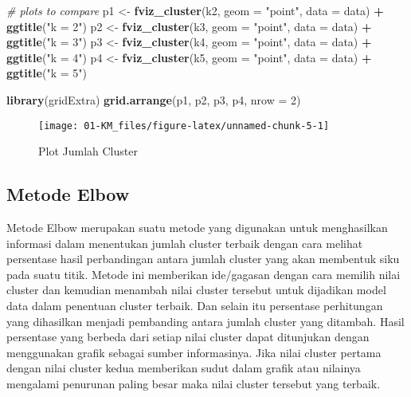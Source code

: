 \documentclass[
]{elegantbook}
\newenvironment{Shaded}{\begin{snugshade}}{\end{snugshade}}
\newcommand{\AttributeTok}[1]{\textcolor[rgb]{0.13,0.29,0.53}{#1}}
\newcommand{\CommentTok}[1]{\textcolor[rgb]{0.56,0.35,0.01}{\textit{#1}}}
\newcommand{\DecValTok}[1]{\textcolor[rgb]{0.00,0.00,0.81}{#1}}
\newcommand{\FunctionTok}[1]{\textcolor[rgb]{0.13,0.29,0.53}{\textbf{#1}}}
\newcommand{\NormalTok}[1]{#1}
\newcommand{\OtherTok}[1]{\textcolor[rgb]{0.56,0.35,0.01}{#1}}
\newcommand{\SpecialCharTok}[1]{\textcolor[rgb]{0.81,0.36,0.00}{\textbf{#1}}}
\newcommand{\StringTok}[1]{\textcolor[rgb]{0.31,0.60,0.02}{#1}}
\begin{document}
\begin{Shaded}
\begin{Highlighting}[]
\CommentTok{\# plots to compare}
\NormalTok{p1 }\OtherTok{\textless{}{-}} \FunctionTok{fviz\_cluster}\NormalTok{(k2, }\AttributeTok{geom =} \StringTok{"point"}\NormalTok{, }\AttributeTok{data =}\NormalTok{ data) }\SpecialCharTok{+} \FunctionTok{ggtitle}\NormalTok{(}\StringTok{"k = 2"}\NormalTok{)}
\NormalTok{p2 }\OtherTok{\textless{}{-}} \FunctionTok{fviz\_cluster}\NormalTok{(k3, }\AttributeTok{geom =} \StringTok{"point"}\NormalTok{,  }\AttributeTok{data =}\NormalTok{ data) }\SpecialCharTok{+} \FunctionTok{ggtitle}\NormalTok{(}\StringTok{"k = 3"}\NormalTok{)}
\NormalTok{p3 }\OtherTok{\textless{}{-}} \FunctionTok{fviz\_cluster}\NormalTok{(k4, }\AttributeTok{geom =} \StringTok{"point"}\NormalTok{,  }\AttributeTok{data =}\NormalTok{ data) }\SpecialCharTok{+} \FunctionTok{ggtitle}\NormalTok{(}\StringTok{"k = 4"}\NormalTok{)}
\NormalTok{p4 }\OtherTok{\textless{}{-}} \FunctionTok{fviz\_cluster}\NormalTok{(k5, }\AttributeTok{geom =} \StringTok{"point"}\NormalTok{,  }\AttributeTok{data =}\NormalTok{ data) }\SpecialCharTok{+} \FunctionTok{ggtitle}\NormalTok{(}\StringTok{"k = 5"}\NormalTok{)}
\end{Highlighting}
\end{Shaded}

\begin{Shaded}
\begin{Highlighting}[]
\FunctionTok{library}\NormalTok{(gridExtra)}
\FunctionTok{grid.arrange}\NormalTok{(p1, p2, p3, p4, }\AttributeTok{nrow =} \DecValTok{2}\NormalTok{)}
\end{Highlighting}
\end{Shaded}

\begin{figure}

{\centering \texttt{[image: 01-KM\_files/figure-latex/unnamed-chunk-5-1]} 

}

\caption{Plot Jumlah Cluster}\label{fig:unnamed-chunk-5}
\end{figure}

\hypertarget{metode-elbow}{%
\subsection{Metode Elbow}\label{metode-elbow}}

Metode Elbow merupakan suatu metode yang digunakan untuk menghasilkan informasi dalam menentukan jumlah cluster terbaik dengan cara melihat persentase hasil perbandingan antara jumlah cluster yang akan membentuk siku pada suatu titik. Metode ini memberikan ide/gagasan dengan cara memilih nilai cluster dan kemudian menambah nilai cluster tersebut untuk dijadikan model data dalam penentuan cluster terbaik. Dan selain itu persentase perhitungan yang dihasilkan menjadi pembanding antara jumlah cluster yang ditambah. Hasil persentase yang berbeda dari setiap nilai cluster dapat ditunjukan dengan menggunakan grafik sebagai sumber informasinya. Jika nilai cluster pertama dengan nilai cluster kedua memberikan sudut dalam grafik atau nilainya mengalami penurunan paling besar maka nilai cluster tersebut yang terbaik.
\end{document}
